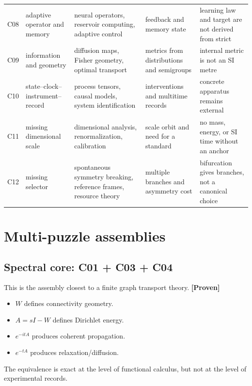 \documentclass[11pt,a4paper,openany]{report}
\newcommand{\statusProven}{\textcolor{fingreen}{[Proven]}}
\begin{document}
\begin{center}
\begin{longtable}{@{}p{}p{}p{}p{}p{}@{}}
C08 & adaptive operator and memory & neural operators, reservoir computing, adaptive control & feedback and memory state & learning law and target are not derived from strict \\
C09 & information and geometry & diffusion maps, Fisher geometry, optimal transport & metrics from distributions and semigroups & internal metric is not an SI metre \\
C10 & state--clock--instrument--record & process tensors, causal models, system identification & interventions and multitime records & concrete apparatus remains external \\
C11 & missing dimensional scale & dimensional analysis, renormalization, calibration & scale orbit and need for a standard & no mass, energy, or SI time without an anchor \\
C12 & missing selector & spontaneous symmetry breaking, reference frames, resource theory & multiple branches and asymmetry cost & bifurcation gives branches, not a canonical choice \\
\bottomrule
\end{longtable}
\endgroup
\end{center}

\chapter{Multi-puzzle assemblies}

\section{Spectral core: C01 + C03 + C04}

This is the assembly closest to a finite graph transport theory. \textbf{\statusProven{}}

\begin{itemize}
\item 
\(W\) defines connectivity geometry.

\item 
\(A=sI-W\) defines Dirichlet energy.

\item 
\(e^{-itA}\) produces coherent propagation.

\item 
\(e^{-tA}\) produces relaxation/\allowbreak{}diffusion.

\end{itemize}

The equivalence is exact at the level of functional calculus, but not at the level of experimental records.
\end{document}
